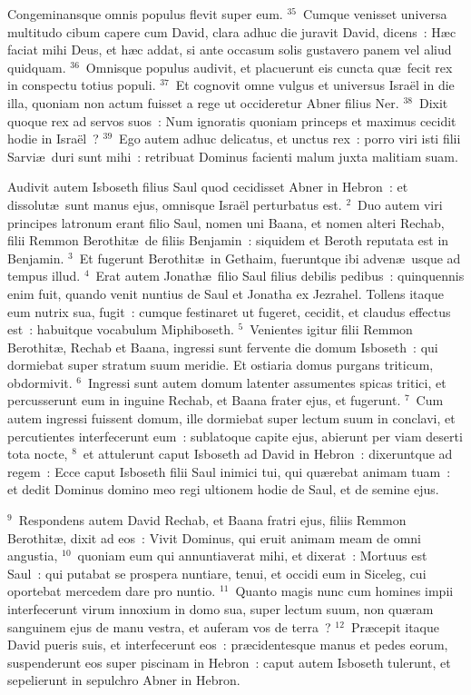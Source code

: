  Congeminansque omnis populus flevit super eum.
${}^{35}$~Cumque venisset universa multitudo cibum capere cum David, clara adhuc die juravit David, dicens~: H\ae c faciat mihi Deus, et h\ae c addat, si ante occasum solis gustavero panem vel aliud quidquam.
${}^{36}$~Omnisque populus audivit, et placuerunt eis cuncta qu\ae\ fecit rex in conspectu totius populi.
${}^{37}$~Et cognovit omne vulgus et universus Isra\"el in die illa, quoniam non actum fuisset a rege ut occideretur Abner filius Ner.
${}^{38}$~Dixit quoque rex ad servos suos~: Num ignoratis quoniam princeps et maximus cecidit hodie in Isra\"el~?
${}^{39}$~Ego autem adhuc delicatus, et unctus rex~: porro viri isti filii Sarvi\ae\ duri sunt mihi~: retribuat Dominus facienti malum juxta malitiam suam.

\lettrine[lines=3,image=true,loversize=0.05,lraise=-0.03]{A}{}udivit autem Isboseth filius Saul quod cecidisset Abner in Hebron~: et dissolut\ae\ sunt manus ejus, omnisque Isra\"el perturbatus est.
${}^{2}$~Duo autem viri principes latronum erant filio Saul, nomen uni Baana, et nomen alteri Rechab, filii Remmon Berothit\ae\ de filiis Benjamin~: siquidem et Beroth reputata est in Benjamin.
${}^{3}$~Et fugerunt Berothit\ae\ in Gethaim, fueruntque ibi adven\ae\ usque ad tempus illud.
${}^{4}$~Erat autem Jonath\ae\ filio Saul filius debilis pedibus~: quinquennis enim fuit, quando venit nuntius de Saul et Jonatha ex Jezrahel. Tollens itaque eum nutrix sua, fugit~: cumque festinaret ut fugeret, cecidit, et claudus effectus est~: habuitque vocabulum Miphiboseth.
${}^{5}$~Venientes igitur filii Remmon Berothit\ae , Rechab et Baana, ingressi sunt fervente die domum Isboseth~: qui dormiebat super stratum suum meridie. Et ostiaria domus purgans triticum, obdormivit.
${}^{6}$~Ingressi sunt autem domum latenter assumentes spicas tritici, et percusserunt eum in inguine Rechab, et Baana frater ejus, et fugerunt.
${}^{7}$~Cum autem ingressi fuissent domum, ille dormiebat super lectum suum in conclavi, et percutientes interfecerunt eum~: sublatoque capite ejus, abierunt per viam deserti tota nocte,
${}^{8}$~et attulerunt caput Isboseth ad David in Hebron~: dixeruntque ad regem~: Ecce caput Isboseth filii Saul inimici tui, qui qu\ae rebat animam tuam~: et dedit Dominus domino meo regi ultionem hodie de Saul, et de semine ejus.


${}^{9}$~Respondens autem David Rechab, et Baana fratri ejus, filiis Remmon Berothit\ae , dixit ad eos~: Vivit Dominus, qui eruit animam meam de omni angustia,
${}^{10}$~quoniam eum qui annuntiaverat mihi, et dixerat~: Mortuus est Saul~: qui putabat se prospera nuntiare, tenui, et occidi eum in Siceleg, cui oportebat mercedem dare pro nuntio.
${}^{11}$~Quanto magis nunc cum homines impii interfecerunt virum innoxium in domo sua, super lectum suum, non qu\ae ram sanguinem ejus de manu vestra, et auferam vos de terra~?
${}^{12}$~Pr\ae cepit itaque David pueris suis, et interfecerunt eos~: pr\ae cidentesque manus et pedes eorum, suspenderunt eos super piscinam in Hebron~: caput autem Isboseth tulerunt, et sepelierunt in sepulchro Abner in Hebron.

